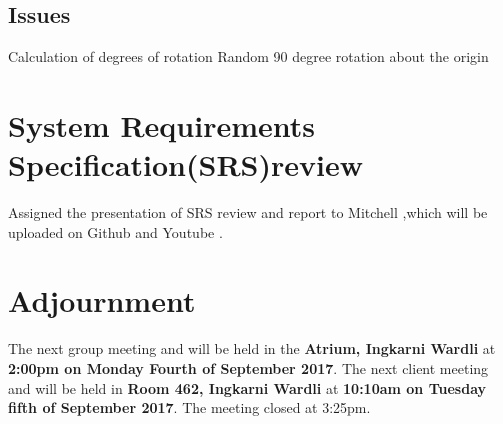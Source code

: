 \documentclass{article}
\begin{document}
\subsection{Issues}
Calculation of degrees of rotation \newline
Random 90 degree rotation about the origin \newline


\section{System Requirements Specification(SRS)review }
Assigned the presentation of SRS review and report to Mitchell ,which will be uploaded on Github and Youtube .

\section{Adjournment}
	The next group meeting and will be held in the {\bf Atrium, Ingkarni Wardli} at {\bf 2:00pm on Monday Fourth of September  2017}.
    \newline
    The next client meeting and will be held in {\bf Room 462, Ingkarni Wardli} at {\bf 10:10am on Tuesday fifth of September 2017}.
    \newline
The meeting closed at 3:25pm.
\end{document}
